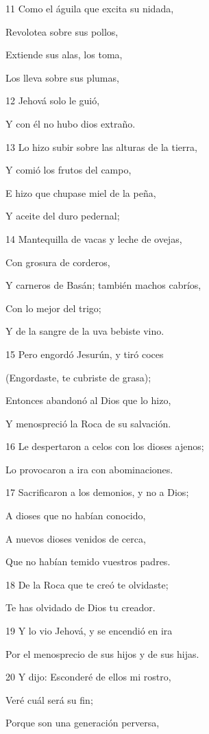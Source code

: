 \par 11 Como el águila que excita su nidada,
\par Revolotea sobre sus pollos,
\par Extiende sus alas, los toma,
\par Los lleva sobre sus plumas, 
\par 12 Jehová solo le guió,
\par Y con él no hubo dios extraño.
\par 13 Lo hizo subir sobre las alturas de la tierra,
\par Y comió los frutos del campo,
\par E hizo que chupase miel de la peña,
\par Y aceite del duro pedernal;
\par 14 Mantequilla de vacas y leche de ovejas,
\par Con grosura de corderos, 
\par Y carneros de Basán; también machos cabríos,
\par Con lo mejor del trigo;
\par Y de la sangre de la uva bebiste vino.
\par 15 Pero engordó Jesurún, y tiró coces
\par (Engordaste, te cubriste de grasa);
\par Entonces abandonó al Dios que lo hizo,
\par Y menospreció la Roca de su salvación. 
\par 16 Le despertaron a celos con los dioses ajenos;
\par Lo provocaron a ira con abominaciones. 
\par 17 Sacrificaron a los demonios, y no a Dios; 
\par A dioses que no habían conocido,
\par A nuevos dioses venidos de cerca,
\par Que no habían temido vuestros padres. 
\par 18 De la Roca que te creó te olvidaste;
\par Te has olvidado de Dios tu creador.
\par 19 Y lo vio Jehová, y se encendió en ira
\par Por el menosprecio de sus hijos y de sus hijas. 
\par 20 Y dijo: Esconderé de ellos mi rostro,
\par Veré cuál será su fin;
\par Porque son una generación perversa,
